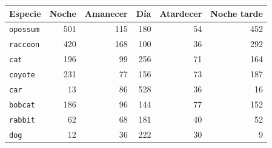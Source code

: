 \begin{center}
  \footnotesize
  \label{tab:actividad_franjas}
  \begin{tabular}{lrrrrr}
    \toprule
    Especie & Noche & Amanecer & Día & Atardecer & Noche tarde \\
    \midrule
    \texttt{opossum} & 501 & 115 & 180 & 54 & 452 \\
    \texttt{raccoon} & 420 & 168 & 100 & 36 & 292 \\
    \texttt{cat} & 196 & 99 & 256 & 71 & 164 \\
    \texttt{coyote} & 231 & 77 & 156 & 73 & 187 \\
    \texttt{car} & 13 & 86 & 528 & 36 & 16 \\
    \texttt{bobcat} & 186 & 96 & 144 & 77 & 152 \\
    \texttt{rabbit} & 62 & 68 & 181 & 40 & 52 \\
    \texttt{dog} & 12 & 36 & 222 & 30 & 9 \\
    \bottomrule
  \end{tabular}
\end{center}

